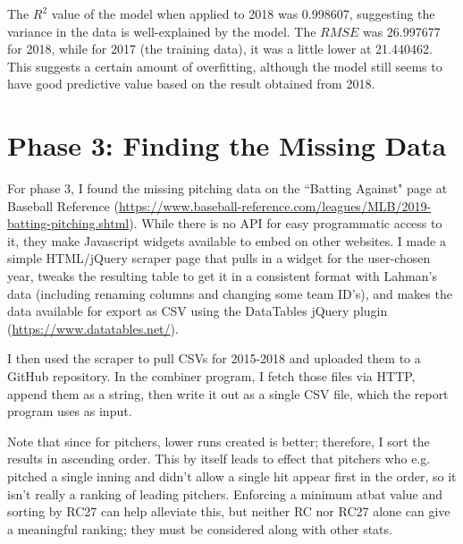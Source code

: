 \documentclass{article}
\begin{document}
	The $R^2$ value of the model when applied to 2018 was 0.998607, suggesting the variance in the data is well-explained by the model. The $RMSE$ was 26.997677 for 2018, while for 2017 (the training data), it was a little lower at 21.440462. This suggests a certain amount of overfitting, although the model still seems to have good predictive value based on the result obtained from 2018.
	
	\section{Phase 3: Finding the Missing Data}
	For phase 3, I found the missing pitching data on the ``Batting Against" page at Baseball Reference (\url{https://www.baseball-reference.com/leagues/MLB/2019-batting-pitching.shtml}). While there is no API for easy programmatic access to it, they make Javascript widgets available to embed on other websites. I made a simple HTML/jQuery scraper page that pulls in a widget for the user-chosen year, tweaks the resulting table to get it in a consistent format with Lahman's data (including renaming columns and changing some team ID's), and makes the data available for export as CSV using the DataTables jQuery plugin (\url{https://www.datatables.net/}).
	
	I then used the scraper to pull CSVs for 2015-2018 and uploaded them to a GitHub repository. In the combiner program, I fetch those files via HTTP, append them as a string, then write it out as a single CSV file, which the report program uses as input.
	
	Note that since for pitchers, lower runs created is better; therefore, I sort the results in ascending order. This by itself leads to effect that pitchers who e.g. pitched a single inning and didn't allow a single hit appear first in the order, so it isn't really a ranking of leading pitchers. Enforcing a minimum atbat value and sorting by RC27 can help alleviate this, but neither RC nor RC27 alone can give a meaningful ranking; they must be considered along with other stats.
	
\end{document}
